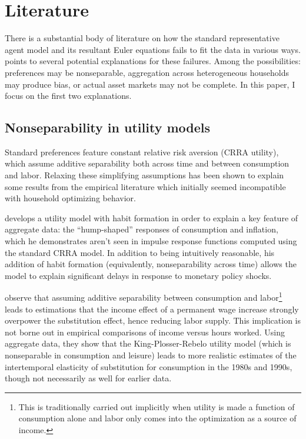 \section{Literature}
There is a substantial body of literature on how the standard representative agent model and its resultant Euler equations fails to fit the data in various ways. \cite{parker99} points to several potential explanations for these failures. Among the possibilities: preferences may be nonseparable, aggregation across heterogeneous households may produce bias, or actual asset markets may not be complete. In this paper, I focus on the first two explanations.



\subsection{Nonseparability in utility models}
Standard preferences feature constant relative risk aversion (CRRA utility), which assume additive separability both across time and between consumption and labor. Relaxing these simplifying assumptions has been shown to explain some results from the empirical literature which initially seemed incompatible with household optimizing behavior.

\cite{fuhrer00} develops a utility model with habit formation in order to explain a key feature of aggregate data: the ``hump-shaped'' responses of consumption and inflation, which he demonstrates aren't seen in impulse response functions computed using the standard CRRA model. In addition to being intuitively reasonable, his addition of habit formation (equivalently, nonseparability across time) allows the model to explain significant delays in response to monetary policy shocks.

\cite{basu02} observe that assuming additive separability between consumption and labor\footnote{This is traditionally carried out implicitly when utility is made a function of consumption alone and labor only comes into the optimization as a source of income.} leads to estimations that the income effect of a permanent wage increase strongly overpower the substitution effect, hence reducing labor supply. This implication is not borne out in empirical comparisons of income versus hours worked. Using aggregate data, they show that the King-Plosser-Rebelo utility model (which is nonseparable in consumption and leisure) leads to more realistic estimates of the intertemporal elasticity of substitution for consumption in the 1980s and 1990s, though not necessarily as well for earlier data.



